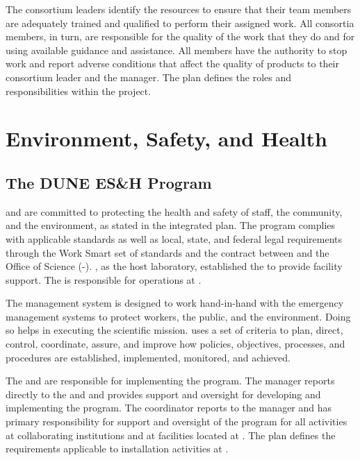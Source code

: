 The  consortium leaders identify the
resources to ensure that their team members are adequately trained and
qualified to perform their assigned work. 
All consortia members, in turn, are responsible for the quality of the work that
they do and for using available guidance and assistance. All members 
have the authority to stop work and report adverse conditions that
affect the quality of  products to their 
 consortium leader and the 
 manager. The  plan
defines the  roles and responsibilities within the 
project.


\section{Environment, Safety, and Health}
\label{sec:es-tc-eshq}

\subsection{The DUNE ES\&H Program}
\label{sec:es-tc-eshq-prog}

 and  are committed to protecting the health and
safety of staff, the community, and the environment, as stated in the
 integrated  plan.  The
 program complies with applicable standards as well as local,
state, and federal legal requirements through the  Work Smart set
of standards and the contract between  and the
 Office of Science (-). , as the host
laboratory, established the  to provide
facility support.  The  is responsible
for  operations at .

The   management system is
designed to work hand-in-hand with the  emergency
management systems to protect workers, the public, and the environment.
 Doing so helps in executing the
scientific mission.   uses a set of criteria to plan, direct,
control, coordinate, assure, and improve how  policies,
objectives, processes, and procedures are established, implemented,
monitored, and achieved. 



The  and  are responsible for
implementing the   program.  The
  manager reports directly to the
 and  and provides
 support and oversight for developing and implementing the
  program. The  
coordinator reports to the  
manager and has primary responsibility for  support and
oversight of the   program for all activities
at collaborating institutions and at 
facilities located at . The   plan defines the 
requirements applicable to installation activities at . 


